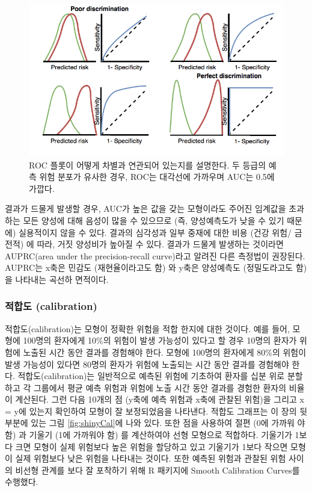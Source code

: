 \documentclass[11pt]{book}
\theoremstyle{definition}
\theoremstyle{definition}
\theoremstyle{definition}
\theoremstyle{remark}
\begin{document}
\begin{figure}
\includegraphics[width=1\linewidth]{images/PatientLevelPrediction/theory/roctheory} \caption{ROC 플롯이 어떻게 차별과 연관되어 있는지를 설명한다. 두 등급의 예측 위험 분포가 유사한 경우, ROC는 대각선에 가까우며 AUC는 0.5에 가깝다.}\label{fig:figuretheoryroctheory}
\end{figure}

결과가 드물게 발생할 경우, AUC가 높은 값을 갖는 모형이라도 주어진
임계값을 초과하는 모든 양성에 대해 음성이 많을 수 있으므로 (즉,
양성예측도가 낮을 수 있기 때문에) 실용적이지 않을 수 있다. 결과의
심각성과 일부 중재에 대한 비용 (건강 위험/ 금전적) 에 따라, 거짓
양성비가 높아질 수 있다. 결과가 드물게 발생하는 것이라면 AUPRC(area
under the precision-recall curve)라고 알려진 다른 측정법이 권장된다.
AUPRC는 x축은 민감도 (재현율이라고도 함) 와 y축은 양성예측도
(정밀도라고도 함) 을 나타내는 곡선하 면적이다.

\subsubsection*{적합도 (calibration)}\label{-calibration}

적합도(calibration)는 모형이 정확한 위험을 적합 한지에 대한 것이다. 예를
들어, 모형에 100명의 환자에게 10\%의 위험이 발생 가능성이 있다고 할 경우
10명의 환자가 위험에 노출된 시간 동안 결과를 경험해야 한다. 모형에
100명의 환자에게 80\%의 위험이 발생 가능성이 있다면 80명의 환자가 위험에
노출되는 시간 동안 결과를 경험해야 한다. 적합도(calibration)는
일반적으로 예측된 위험에 기초하여 환자를 십분 위로 분할하고 각 그룹에서
평균 예측 위험과 위험에 노출 시간 동안 결과를 경험한 환자의 비율이
계산된다. 그런 다음 10개의 점 (y축에 예측 위험과 x축에 관찰된 위험)을
그리고 x = y에 있는지 확인하여 모형이 잘 보정되었음을 나타낸다. 적합도
그래프는 이 장의 뒷부분에 있는 그림 \ref{fig:shinyCal}에 나와 있다. 또한
점을 사용하여 절편 (0에 가까워 야 함) 과 기울기 (1에 가까워야 함) 를
계산하여야 선형 모형으로 적합하다. 기울기가 1보다 크면 모형이 실제
위험보다 높은 위험을 할당하고 있고 기울기가 1보다 작으면 모형이 실제
위험보다 낮은 위험을 나타내는 것이다. 또한 예측된 위험과 관찰된 위험
사이의 비선형 관계를 보다 잘 포착하기 위해 R 패키지에 Smooth Calibration
Curves를 수행했다. 
\end{document}
